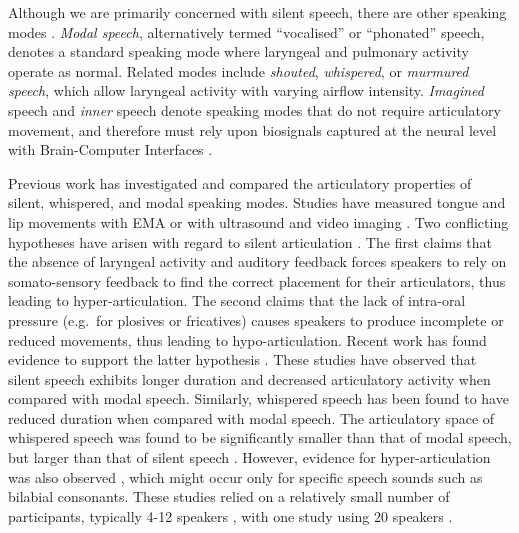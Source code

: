 \documentclass[a4paper]{article}
\begin{document}
Although we are primarily concerned with silent speech, there are other speaking modes \cite{schultz2017biosignal}.
\emph{Modal speech}, alternatively termed \enquote{vocalised} or \enquote{phonated} speech, denotes a standard speaking mode where laryngeal and pulmonary activity operate as normal.
Related modes include \emph{shouted}, \emph{whispered}, or \emph{murmured speech}, which allow laryngeal activity with varying airflow intensity.
\emph{Imagined} speech and \emph{inner} speech denote speaking modes that do not require articulatory movement, and therefore must rely upon biosignals captured at the neural level with Brain-Computer Interfaces  \cite{wolpaw2002brain, herff2016automatic, clayton2020decoding}.

Previous work has investigated and compared the articulatory properties of silent, whispered, and modal speaking modes.
Studies have measured tongue and lip movements with EMA \cite{janke2010impact, dromey2017effects, teplansky2019tongue, teplansky2020tongue} or with ultrasound and video imaging \cite{crevier2011articulatory}.
Two conflicting hypotheses have arisen with regard to silent articulation \cite{dromey2017effects}.
The first claims that the absence of laryngeal activity and auditory feedback forces speakers to rely on somato-sensory feedback to find the correct placement for their articulators, thus leading to hyper-articulation.
The second claims that the lack of intra-oral pressure (e.g.\ for plosives or fricatives) causes speakers to produce incomplete or reduced movements, thus leading to hypo-articulation.
Recent work has found evidence to support the latter hypothesis \cite{dromey2017effects, teplansky2019tongue, teplansky2020tongue, crevier2011articulatory}.
These studies have observed that silent speech exhibits longer duration and decreased articulatory activity when compared with modal speech.
Similarly, whispered speech has been found to have reduced duration \cite{dromey2017effects, teplansky2019tongue} when compared with modal speech.
The articulatory space of whispered speech was found to be significantly smaller than that of modal speech, but larger than that of silent speech \cite{teplansky2019tongue}.
However, evidence for hyper-articulation was also observed \cite{janke2010impact}, which might occur only for specific speech sounds such as bilabial consonants.
These studies relied on a relatively small number of participants, typically 4-12 speakers \cite{florescu2010silent, teplansky2019tongue, teplansky2020tongue, janke2010impact}, with one study using 20 speakers \cite{dromey2017effects}.
\end{document}
